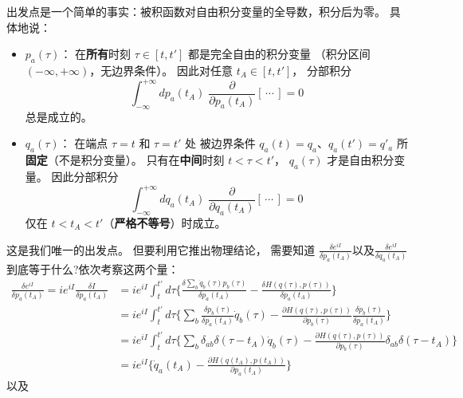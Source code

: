 \bigskip
\medskip\noindent
出发点是一个简单的事实：被积函数对自由积分变量的全导数，积分后为零。 具体地说：
\begin{itemize}
  \item \textbf{$p_a(\tau)$}：
    在\textbf{所有}时刻 $\tau\in[t,t']$
    都是完全自由的积分变量
    （积分区间 $(-\infty,+\infty)$，无边界条件）。
    因此对任意 $t_A\in[t,t']$，
    分部积分
    \begin{equation}\label{eq:IBP-p}
      \int_{-\infty}^{+\infty}\!dp_a(t_A)\;
      \frac{\partial}{\partial p_a(t_A)}[\,\cdots\,]=0
    \end{equation}
    总是成立的。

  \item \textbf{$q_a(\tau)$}：
    在端点 $\tau=t$ 和 $\tau=t'$ 处
    被边界条件 $q_a(t)=q_a$、$q_a(t')=q'_a$
    所\textbf{固定}（不是积分变量）。
    只有在\textbf{中间}时刻 $t<\tau<t'$，
    $q_a(\tau)$ 才是自由积分变量。
    因此分部积分
    \begin{equation}\label{eq:IBP-q}
      \int_{-\infty}^{+\infty}\!dq_a(t_A)\;
      \frac{\partial}{\partial q_a(t_A)}[\,\cdots\,]=0
    \end{equation}
    仅在 $t<t_A<t'$（\textbf{严格不等号}）时成立。
\end{itemize}
这是我们唯一的出发点。
但要利用它推出物理结论，
需要知道
$\frac{\delta e^{iI}}{\delta p_a(t_A)}$以及$\frac{\delta e^{iI}}{\delta q_a(t_A)}$ 到底等于什么?依次考察这两个量：
\[\begin{aligned}
  \frac{\delta e^{iI}}{\delta p_a(t_A)}=
  ie^{iI}\frac{\delta I}{\delta p_a(t_A)}&=ie^{iI}\int_{t}^{t'}d\tau \Biggl\{ \frac{\delta \sum_{b}\dot{q}_b(\tau) p_{b}(\tau)}{\delta p_a(t_A)}-\frac{\delta H(q(\tau),p(\tau))}{\delta p_a(t_A)}\Biggr\}
  \\
  \;&=ie^{iI}\int_{t}^{t'}d\tau \Biggl\{ \sum_{b}\frac{\delta p_{b}(\tau) }{\delta p_a(t_A)}\dot{q}_b(\tau)-\frac{\partial H(q(\tau),p(\tau))}{\partial p_b(\tau)}\frac{\delta p_b(\tau)}{\delta p_a(t_A)}\Biggr\}
  \\
  \;&=ie^{iI}\int_{t}^{t'}d\tau \Biggl\{ \sum_{b}\delta_{ab}\delta(\tau-t_A)\dot{q}_b(\tau)-\frac{\partial H(q(\tau),p(\tau))}{\partial p_b(\tau)}\delta_{ab}\delta(\tau-t_A)\Biggr\}
  \\
  \;&=ie^{iI} \Biggl\{ \dot{q}_a(t_A)-\frac{\partial H(q(t_A),p(t_A))}{\partial p_a(t_A)}\Biggr\}
\end{aligned}\]
以及
